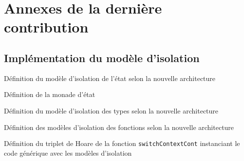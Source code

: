 \chapter{Annexes de la dernière contribution}

\section{Implémentation du modèle d'isolation}
\begin{codeenv}
	\caption{Définition du modèle d'isolation de l'état selon la nouvelle architecture}
	\label{code:IsolationState}
\end{codeenv}

\begin{codeenv}
	\caption{Définition de la monade d'état}
	\label{code:StateAgnosticMonad}
\end{codeenv}

\begin{codeenv}
	\caption{Définition du modèle d'isolation des types selon la nouvelle architecture}
	\label{code:IsolationTypes}
\end{codeenv}

\begin{codeenv}
	\caption{Définition des modèles d'isolation des fonctions selon la nouvelle architecture}
	\label{code:IsolationFunctions}
\end{codeenv}

\begin{codeenv}
	\caption{Définition du triplet de Hoare de la fonction \texttt{switchContextCont} instanciant le code générique avec les modèles d'isolation}
	\label{code:switchContextCont_agn_triple}
\end{codeenv}

